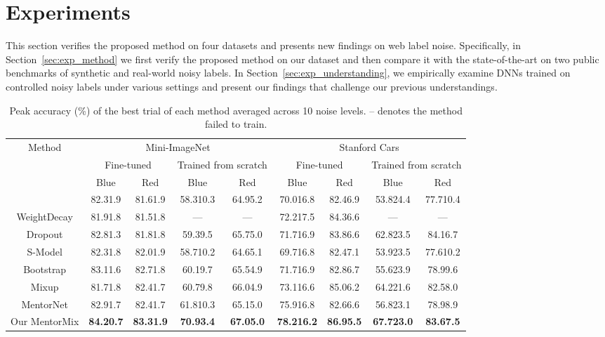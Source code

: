 \documentclass{article}
\begin{document}
\section{Experiments}\label{sec:experiments}
This section verifies the proposed method on four datasets and presents new findings on web label noise. Specifically, in Section~\ref{sec:exp_method} we first verify the proposed method on our dataset and then compare it with the state-of-the-art on two public benchmarks of synthetic and real-world noisy labels. In Section~\ref{sec:exp_understanding}, we empirically examine DNNs trained on controlled noisy labels under various settings and present our findings that challenge our previous understandings.

\begin{table*}[ht]
\centering
\caption{Peak accuracy (\%) of the best trial of each method averaged across 10 noise levels. -- denotes the method failed to train.}
\label{tab:baseline}
\begin{tabular}{|c|cc|cc|cc|cc|}
\toprule
\multicolumn{1}{|c|}{\multirow{4}{*}{Method}} & \multicolumn{4}{c|}{Mini-ImageNet} & \multicolumn{4}{c|}{Stanford Cars} \\
\multicolumn{1}{|c|}{} & \multicolumn{2}{c|}{Fine-tuned} & \multicolumn{2}{c|}{Trained from scratch} & \multicolumn{2}{c|}{Fine-tuned} & \multicolumn{2}{c|}{Trained from scratch} \\
\multicolumn{1}{|c|}{} & Blue & Red & Blue & Red & Blue & Red & Blue & \multicolumn{1}{c|}{Red} \\
\hline
Vanilla&	82.31.9&	81.61.9&	58.310.3&	64.95.2&	70.016.8&	82.46.9&	53.824.4&	77.710.4\\
WeightDecay&	81.91.8&	81.51.8&	---& ---&	72.217.5&	84.36.6&	---&	---\\
Dropout&	82.81.3&	81.81.8&	59.39.5&	65.75.0&	71.716.9&	83.86.6&	62.823.5&	84.16.7\\
S-Model&	82.31.8&	82.01.9&	58.710.2&	64.65.1&	69.716.8&	82.47.1&	53.923.5&	77.610.2\\
Bootstrap&	83.11.6&	82.71.8&	60.19.7&	65.54.9&	71.716.9&	82.86.7&	55.623.9&	78.99.6\\
Mixup&	81.71.8&	82.41.7&	60.79.8&	66.04.9&	73.116.6&	85.06.2&	64.221.6&	82.58.0\\
MentorNet&	82.91.7&	82.41.7&	61.810.3&	65.15.0&	75.916.8&	82.66.6&	56.823.1&	78.98.9\\
{Our MentorMix}&	{\bf 84.20.7}&	{\bf 83.31.9}&	{\bf 70.93.4}&	{\bf 67.05.0}&	{\bf 78.216.2}&	{\bf 86.95.5}&	{\bf 67.723.0} &	{\bf 83.67.5}\\
\bottomrule
\end{tabular}
\vspace{-3mm}
\end{table*}
\end{document}
